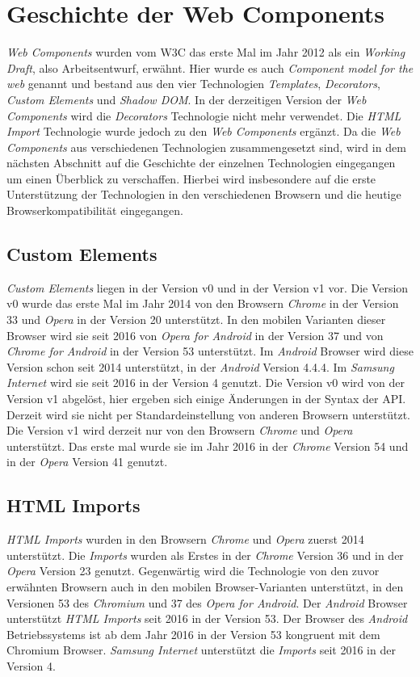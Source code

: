 \documentclass[12pt, paper=a4, bibtotoc, toc=listof, headsepline=true]{scrreprt}
\begin{document}
	\section{Geschichte der Web Components}
	\label{ref:gesVonWebCom}
	\emph{Web Components} wurden vom \ac{W3C} das erste Mal im Jahr 2012 als ein \emph{Working Draft}, also Arbeitsentwurf, erwähnt. Hier wurde es auch \emph{Component model for the web} genannt und bestand aus den vier Technologien \emph{Templates}, \emph{Decorators}, \emph{Custom Elements} und \emph{Shadow DOM}. In der derzeitigen Version der \emph{Web Components} wird die \emph{Decorators} Technologie nicht mehr verwendet. Die \emph{\ac{HTML} Import} Technologie wurde jedoch zu den \emph{Web Components} ergänzt.\cite[vgl.]{Cooney2012} Da die \emph{Web Components} aus verschiedenen Technologien zusammengesetzt sind, wird in dem nächsten Abschnitt auf die Geschichte der einzelnen Technologien eingegangen um einen Überblick zu verschaffen. Hierbei wird insbesondere auf die erste Unterstützung der Technologien in den verschiedenen Browsern und die heutige Browserkompatibilität eingegangen.
		\subsection{Custom Elements}
		\emph{Custom Elements} liegen in der Version v0 und in der Version v1 vor. Die Version v0 wurde das erste Mal im Jahr 2014 von den Browsern \emph{Chrome} in der Version 33 und \emph{Opera} in der Version 20 unterstützt. In den mobilen Varianten dieser Browser  wird sie seit 2016 von \emph{Opera for Android} in der Version 37 und von \emph{Chrome for Android} in der Version 53 unterstützt.\cite[vgl.]{C2015} Im \emph{Android} Browser wird diese Version schon seit 2014 unterstützt, in der \emph{Android} Version 4.4.4. Im \emph{Samsung Internet} wird sie seit 2016 in der Version 4 genutzt.\cite[vgl.]{cusEleCanIUse} Die Version v0 wird von der Version v1 abgelöst, hier ergeben sich einige Änderungen in der Syntax der \ac{API}.\cite[vgl.]{Bidelman2016cusElev1} Derzeit wird sie nicht per Standardeinstellung von anderen Browsern unterstützt.\cite[vgl.]{firefox} Die Version v1 wird derzeit nur von den Browsern \emph{Chrome} und \emph{Opera} unterstützt. Das erste mal wurde sie im Jahr 2016 in der \emph{Chrome} Version 54 und in der \emph{Opera} Version 41 genutzt. \cite[vgl.]{C2016}
		\subsection{HTML Imports}
		\emph{\ac{HTML} Imports} wurden in den Browsern \emph{Chrome} und \emph{Opera} zuerst 2014 unterstützt. Die \emph{Imports} wurden als Erstes in der \emph{Chrome} Version 36 und in der \emph{Opera} Version 23 genutzt. Gegenwärtig wird die Technologie von den zuvor erwähnten Browsern auch in den mobilen Browser-Varianten unterstützt, in den Versionen 53 des \emph{Chromium} und 37 des \emph{Opera for Android}.\cite[vgl.]{Morrita2015} Der \emph{Android} Browser unterstützt \emph{\ac{HTML} Imports} seit 2016 in der Version 53. Der Browser des \emph{Android} Betriebssystems ist ab dem Jahr 2016 in der Version 53 kongruent mit dem Chromium Browser. \emph{Samsung Internet} unterstützt die \emph{Imports} seit 2016 in der Version 4.\cite[vgl.]{htmlTemplCaniuse}
\end{document}
